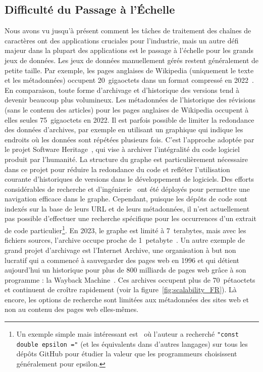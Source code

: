 \subsection*{Difficulté du Passage à l'Échelle}

Nous avons vu jusqu'à présent comment les tâches de traitement des chaînes de caractères ont des applications cruciales pour l'industrie, mais un autre défi majeur dans la plupart des applications est le passage à l'échelle pour les grands jeux de données.
Les jeux de données manuellement gérés restent généralement de petite taille. Par exemple, les pages anglaises de Wikipedia (uniquement le texte et les métadonnées) occupent 20~gigaoctets dans un format compressé en 2022~\cite{wikimedia}. En comparaison, toute forme d'archivage et d'historique des versions tend à devenir beaucoup plus volumineux. Les métadonnées de l'historique des révisions (sans le contenu des articles) pour les pages anglaises de Wikipedia occupent à elles seules 75~gigaoctets en 2022.
Il est parfois possible de limiter la redondance des données d'archives, par exemple en utilisant un graphique qui indique les endroits où les données sont répétées plusieurs fois. C'est l'approche adoptée par le projet Software Heritage~\cite{swh-site}, qui vise à archiver l'intégralité du code logiciel produit par l'humanité. La structure du graphe est particulièrement nécessaire dans ce projet pour réduire la redondance du code et refléter l'utilisation courante d'historiques de versions dans le développement de logiciels.
Des efforts considérables de recherche et d'ingénierie~\cite{DBLP:phd/hal/Pietri21} ont été déployés pour permettre une navigation efficace dans le graphe. 
Cependant, puisque les dépôts de code sont indexés sur la base de leurs URL et de leurs métadonnées, il n'est actuellement pas possible d'effectuer une recherche spécifique pour les occurrences d'un extrait de code particulier\footnote{\setlength\parindent{10pt} Un exemple simple mais intéressant est~\cite{vii2014if} où l'auteur a recherché \texttt{"const double epsilon ="} (et les équivalents dans d'autres langages) sur tous les dépôts GitHub pour étudier la valeur que les programmeurs choisissent généralement pour epsilon.}.
En 2023, le graphe est limité à 7~terabytes, mais avec les fichiers sources, l'archive  occupe proche de 1~petabyte~\cite{swh-polytechnique}.
Un autre exemple de grand projet d'archivage est l'Internet Archive, une organisation à but non lucratif qui a commencé à sauvegarder des pages web en 1996 et qui détient aujourd'hui un historique pour plus de 800 milliards de pages web grâce à son programme : la Wayback Machine~\cite{web-archive}. Ces archives occupent plus de 70~pétaoctets et continuent de croître rapidement (voir la figure~\ref{fig:scalability_FR}).
Là encore, les options de recherche sont limitées aux métadonnées des sites web et non au contenu des pages web elles-mêmes.

